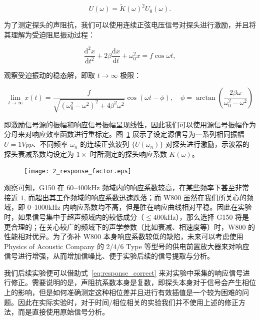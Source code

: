 \begin{equation}
  U(\omega) = \widetilde{K}(\omega)^{2}U_{0}(\omega).
\end{equation}

为了测定探头的声阻抗，我们可以使用连续正弦电压信号对探头进行激励，并且将其理解为受迫阻尼振动过程：

\begin{equation}
  \frac{\mathrm{d}^{2}x}{\mathrm{d}t^{2}} + 2\beta\frac{\mathrm{d}x}{\mathrm{d}t} + \omega_{0}^{2}x = f\cos{\omega t},
\end{equation}

观察受迫振动的稳态解，即取 $t\rightarrow \infty$ 极限：

\begin{equation}
  \lim_{t\rightarrow \infty} x(t) = \frac{f}{\sqrt{(\omega_{0}^{2} - \omega^{2})^{2} + 4\beta^{2}\omega^{2}}}\cos{(\omega t - \phi)},\quad \phi = \arctan{\left(\frac{2\beta\omega}{\omega_{0}^{2}-\omega^{2}}\right)}
\end{equation}

即激励信号源的振幅和响应信号振幅呈现线性，因此我们可以使用源信号振幅作为分母来对响应效率函数进行重标定。图~\ref{fig:response_factor} 展示了设定源信号为一系列相同振幅 $U = 1\unit{Vpp}$、不同频率 $\omega_{n}$ 的连续正弦波列 $\{U(\omega_{n})\}$ 对探头进行激励，示波器的探头衰减系数均设定为 $1\times $ 时所测定的探头响应系数 $\widetilde{K}(\omega)$。

\begin{figure}[!htp]
  \centering
  \texttt{[image: 2\_response\_factor.eps]}
  \label{fig:response_factor}
\end{figure}

观察可知，G150 在 \numrange{60}{400}\unit{\kilo\hertz} 频域内的响应系数较高，在某些频率下甚至非常接近 $1$, 而超出其工作频域的响应系数迅速跌落；而 W800 虽然在我们所关心的频域，即 \numrange{0}{1000}\unit{\kilo\hertz} 内响应系数均不高，但是胜在响应曲线相对平稳。因此在实验时，如果信号集中于超声频域内的较低成分（$\leq 400\unit{\kilo\hertz}$），那么选择 G150 将是更合理的；在关心较广的频域下的声学参数（比如衰减、相速度等）时，W800 的性能相对优异。为了弥补 W800 本身响应系数较低的缺陷，未来可以考虑使用 Physics of Acoustic Company 的 2/4/6 Type 等型号的供电前置放大器来对响应信号进行增强，从而增加信噪比、便于实验后续的信号提取与分析。

我们后续实验便可以借助式~\eqref{eq:response_correct} 来对实验中采集的响应信号进行修正。需要说明的是，声阻抗系数本身是复数，即探头本身对于信号会产生相位上的影响，但是如何准确测定这种相位差并且进行有效插值是一个较为困难的问题。因此在实际实验时，对于时间/相位相关的实验我们并不使用上述的修正方法，而是直接使用原始信号分析。


